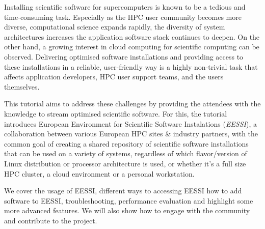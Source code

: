 Installing scientific software for supercomputers is known to be a tedious and time-consuming task. Especially as the HPC user community becomes more diverse, computational science expands rapidly, the diversity of system architectures increases the application software stack continues to deepen. On the other hand, a growing interest in cloud computing for scientific computing can be observed. Delivering optimised software installations and providing access to these installations in a reliable, user-friendly way is a highly non-trivial task that affects application developers, HPC user support teams, and the users themselves.

This tutorial aims to address these challenges by providing the attendees with the knowledge to stream optimised scientific software. For this, the tutorial introduces European Environment for Scientific Software Instalations (\emph{EESSI}), a collaboration between various European HPC sites \& industry partners, with the common goal of creating a shared repository of scientific software installations that can be used on a variety of systems, regardless of which flavor/version of Linux distribution or processor architecture is used, or whether it’s a full size HPC cluster, a cloud environment or a personal workstation.

We cover the usage of EESSI, different ways to accessing EESSI how to add software to EESSI, troubleshooting, performance evaluation and highlight some more advanced features. We will also show how to engage with the community and contribute to the project.
